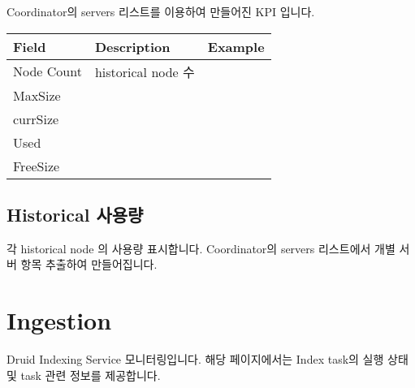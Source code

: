 \documentclass[letterpaper,10pt,english]{sphinxmanual}
\begin{document}
Coordinator의 servers 리스트를 이용하여 만들어진 KPI 입니다.


\begin{savenotes}\sphinxattablestart
\centering
\begin{tabulary}{\linewidth}[t]{|T|T|T|}
\hline
\sphinxstyletheadfamily 
Field
&\sphinxstyletheadfamily 
Description
&\sphinxstyletheadfamily 
Example
\\
\hline
Node Count
&
historical node 수
&\\
\hline
MaxSize
&&\\
\hline
currSize
&&\\
\hline
Used
&&\\
\hline
FreeSize
&&\\
\hline
\end{tabulary}
\par
\sphinxattableend\end{savenotes}


\subsection{Historical 사용량}
\label{\detokenize{discovery/part10/overview:id1}}
각 historical node 의 사용량 표시합니다. Coordinator의 servers 리스트에서 개별 서버 항목 추출하여 만들어집니다.


\section{Ingestion}
\label{\detokenize{discovery/part10/ingestion:ingestion}}\label{\detokenize{discovery/part10/ingestion::doc}}
Druid Indexing Service 모니터링입니다. 해당 페이지에서는 Index task의 실행 상태 및 task 관련 정보를 제공합니다.
\end{document}
